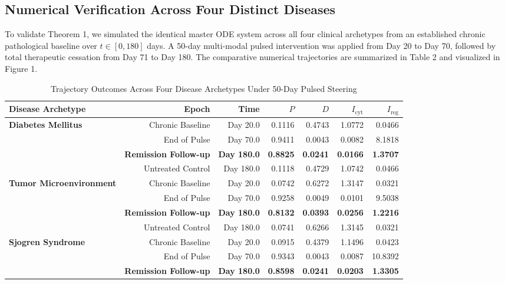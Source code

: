 \documentclass[11pt,a4paper]{article}
\begin{document}
\subsection{Numerical Verification Across Four Distinct Diseases}

To validate Theorem 1, we simulated the identical master ODE system across all four clinical archetypes from an established chronic pathological baseline over $t \in [0, 180]$ days. A 50-day multi-modal pulsed intervention was applied from Day 20 to Day 70, followed by total therapeutic cessation from Day 71 to Day 180. The comparative numerical trajectories are summarized in Table 2 and visualized in Figure 1.

\begin{table}[H]
\centering
\small
\caption{Trajectory Outcomes Across Four Disease Archetypes Under 50-Day Pulsed Steering}
\begin{tabular}{lrrrrrr}
\toprule
\textbf{Disease Archetype} & \textbf{Epoch} & \textbf{Time} & \textbf{$P$} & \textbf{$D$} & \textbf{$I_{\mathrm{cyt}}$} & \textbf{$I_{\mathrm{reg}}$} \\
\midrule
\textbf{Diabetes Mellitus} & Chronic Baseline & Day 20.0 & 0.1116 & 0.4743 & 1.0772 & 0.0466 \\
& End of Pulse & Day 70.0 & 0.9411 & 0.0043 & 0.0082 & 8.1818 \\
& \textbf{Remission Follow-up} & \textbf{Day 180.0} & \textbf{0.8825} & \textbf{0.0241} & \textbf{0.0166} & \textbf{1.3707} \\
& Untreated Control & Day 180.0 & 0.1118 & 0.4729 & 1.0742 & 0.0466 \\
\midrule
\textbf{Tumor Microenvironment} & Chronic Baseline & Day 20.0 & 0.0742 & 0.6272 & 1.3147 & 0.0321 \\
& End of Pulse & Day 70.0 & 0.9258 & 0.0049 & 0.0101 & 9.5038 \\
& \textbf{Remission Follow-up} & \textbf{Day 180.0} & \textbf{0.8132} & \textbf{0.0393} & \textbf{0.0256} & \textbf{1.2216} \\
& Untreated Control & Day 180.0 & 0.0741 & 0.6266 & 1.3145 & 0.0321 \\
\midrule
\textbf{Sjogren Syndrome} & Chronic Baseline & Day 20.0 & 0.0915 & 0.4379 & 1.1496 & 0.0423 \\
& End of Pulse & Day 70.0 & 0.9343 & 0.0043 & 0.0087 & 10.8392 \\
& \textbf{Remission Follow-up} & \textbf{Day 180.0} & \textbf{0.8598} & \textbf{0.0241} & \textbf{0.0203} & \textbf{1.3305} \\

\end{tabular}
\end{table}
\end{document}

